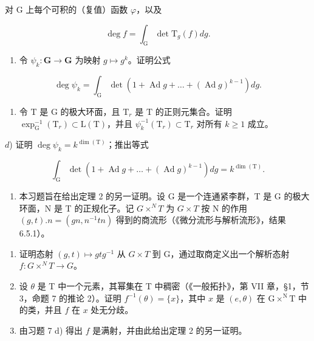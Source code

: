 对 G 上每个可积的（复值）函数 \(\varphi\)，以及

\[
\deg f = \int_ {\mathrm{G}} \det \mathrm{T} _ {g} (f) d g.
\]

\begin{enumerate}
\def\labelenumi{\alph{enumi})}
\setcounter{enumi}{1}
\tightlist
\item
  令 \(\psi_k: \mathbf{G} \to \mathbf{G}\) 为映射 \(g \mapsto g^k\)。证明公式
\end{enumerate}

\[
\deg \psi_ {k} = \int_ {\mathrm{G}} \det (1 + \operatorname{Ad} g + \dots + (\operatorname{Ad} g) ^ {k - 1}) d g.
\]

\begin{enumerate}
\def\labelenumi{\alph{enumi})}
\setcounter{enumi}{2}
\tightlist
\item
  令 \(\mathrm{T}\) 是 \(\mathrm{G}\) 的极大环面，且 \(\mathrm{T}_r\) 是 \(\mathrm{T}\) 的正则元集合。证明 \(\exp_{\mathrm{G}}^{-1}(\mathrm{T}_r) \subset \mathrm{L}(\mathrm{T})\)，并且 \(\psi_k^{-1}(\mathrm{T}_r) \subset \mathrm{T}_r\) 对所有 \(k \geq 1\) 成立。
\end{enumerate}

\(d\)) 证明 \(\deg \psi_{k} = k^{\dim (\mathrm{T})}\)；推出等式

\[
\int_ {\mathrm{G}} \det (1 + \operatorname{Ad} g + \dots + (\operatorname{Ad} g) ^ {k - 1}) d g = k ^ {\dim (\mathrm{T})}.
\]

\begin{enumerate}
\def\labelenumi{\arabic{enumi})}
\setcounter{enumi}{8}
\tightlist
\item
  本习题旨在给出定理 2 的另一证明。设 G 是一个连通紧李群，T 是 G 的极大环面，N 是 T 的正规化子。记 \(G \times^{N} T\) 为 \(G \times T\) 按 N 的作用 \((g, t).n = (gn, n^{-1}tn)\) 得到的商流形（《微分流形与解析流形》，结果 6.5.1）。
\end{enumerate}

\begin{enumerate}
\def\labelenumi{\alph{enumi})}
\item
  证明态射 \((g, t) \mapsto gtg^{-1}\) 从 \(G \times T\) 到 G，通过取商定义出一个解析态射 \(f : G \times^{N} T \to G\)。
\item
  设 \(\theta\) 是 T 中一个元素，其幂集在 T 中稠密（《一般拓扑》，第 VII 章，§1，节 3，命题 7 的推论 2）。证明 \(f^{-1}(\theta) = \{x\}\)，其中 \(x\) 是 \((e,\theta)\) 在 \(\mathrm{G} \times^{\mathrm{N}}\mathrm{T}\) 中的类，并且 \(f\) 在 \(x\) 处无分歧。
\item
  由习题 7 d) 得出 \(f\) 是满射，并由此给出定理 2 的另一证明。
\end{enumerate}

